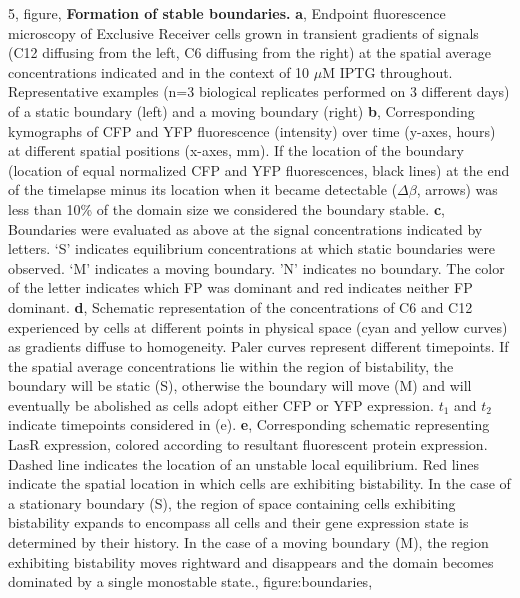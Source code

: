 {        5, figure, {\textbf{Formation of stable boundaries.} \textbf{a}, Endpoint fluorescence microscopy of Exclusive Receiver cells grown in transient gradients of signals (C12 diffusing from the left, C6 diffusing from the right) at the spatial average concentrations indicated and in the context of 10 $\mu$M IPTG throughout.  Representative examples (n=3 biological replicates performed on 3 different days) of a static boundary (left) and a moving boundary (right) \textbf{b}, Corresponding kymographs of CFP and YFP fluorescence (intensity) over time (y-axes, hours) at different spatial positions (x-axes, mm). If the location of the boundary (location of equal normalized CFP and YFP fluorescences, black lines) at the end of the timelapse minus its location when it became detectable ($\Delta\beta$, arrows) was less than 10\% of the domain size we considered the boundary stable.   \textbf{c}, Boundaries were evaluated as above at the signal concentrations indicated by letters. ‘S’ indicates equilibrium concentrations at which static boundaries were observed. ‘M’ indicates a moving boundary. 'N' indicates no boundary.  The color of the letter indicates which FP was dominant and red indicates neither FP dominant. \textbf{d}, Schematic representation of the concentrations of C6 and C12 experienced by cells at different points in physical space (cyan and yellow curves) as gradients diffuse to homogeneity.  Paler curves represent different timepoints.  If the spatial average concentrations lie within the region of bistability, the boundary will be static (S), otherwise the boundary will move (M) and will eventually be abolished as cells adopt either CFP or YFP expression.   $t_1$ and $t_2$ indicate timepoints considered in (e).  \textbf{e}, Corresponding schematic representing LasR expression, colored according to resultant fluorescent protein expression.  Dashed line indicates the location of an unstable local equilibrium. Red lines indicate the spatial location in which cells are exhibiting bistability.  In the case of a stationary boundary (S), the region of space containing cells exhibiting bistability expands to encompass all cells and their gene expression state is determined by their history.  In the case of a moving boundary (M), the region exhibiting bistability moves rightward and disappears and the domain becomes dominated by a single monostable state.}, figure:boundaries,
}
